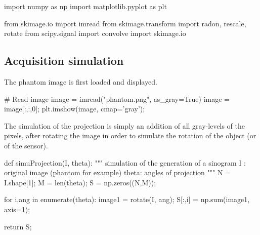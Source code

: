 \def\QRCODE{tp_en_attente_TUT.IMG.tomography_pythonqrcode.png}
\def\QRPAGE{http://www.iptutorials.science/tree/master/tp_en_attente/TUT.IMG.tomography/python}

\begin{python}
import numpy as np
import matplotlib.pyplot as plt

from skimage.io import imread
from skimage.transform import radon, rescale, rotate
from scipy.signal import convolve
import skimage.io
\end{python}


\subsection{Acquisition simulation}
The phantom image is first loaded and displayed.

\begin{python}
# Read image
image = imread("phantom.png", as_gray=True)
image = image[:,:,0];
plt.imshow(image, cmap='gray');
\end{python}

The simulation of the projection is simply an addition of all gray-levels of the pixels, after rotating the image in order to simulate the rotation of the object (or of the sensor).

\begin{python}
def simuProjection(I, theta):
    """
    simulation of the generation of a sinogram
    I : original image (phantom for example)
    theta: angles of projection
    """
    N = I.shape[1];
    M = len(theta);
    S = np.zeros((N,M));

    for i,ang in enumerate(theta):
        image1 = rotate(I, ang);
        S[:,i] = np.sum(image1, axis=1);
        
    return S;
\end{python}



